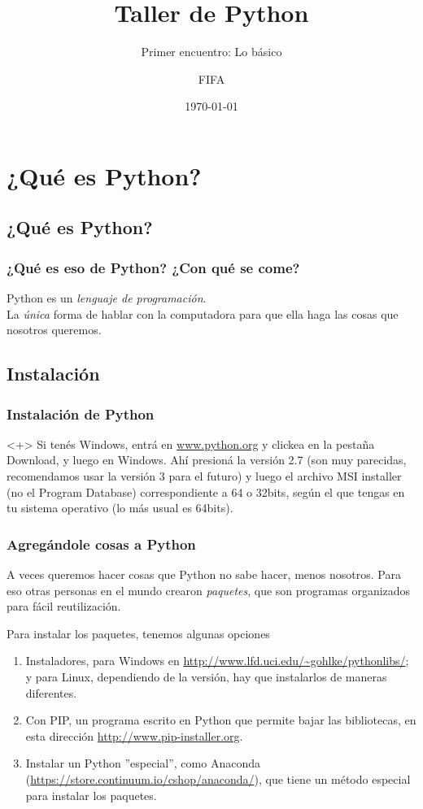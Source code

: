 \documentclass{beamer}
\title{Taller de Python}
\subtitle{Primer encuentro: Lo básico}
\author{FIFA}
\institute[FIFA]{Federación Interestudiantil de Física Argentina}
\date{\today}
\begin{document}
\begin{frame}
  \titlepage
\end{frame}


\section{¿Qué es Python?}

\subsection{¿Qué es Python?}
\begin{frame}
    \frametitle{¿Qué es eso de Python? ¿Con qué se come?}
    Python es un \emph{lenguaje de programación}.\\ La \emph{única} forma de hablar con la computadora para que ella haga las cosas que nosotros queremos.
\end{frame}

\subsection{Instalación}
\begin{frame}
    \frametitle{Instalación de Python}
    \begin{onlyenv}<+>
    Si tenés Windows, entrá en \url{www.python.org} y clickea en la pestaña Download, y luego en Windows. Ahí presioná la versión 2.7 (son muy parecidas, recomendamos usar la versión 3 para el futuro) y luego el archivo MSI installer (no el Program Database) correspondiente a 64 o 32bits, según el que tengas en tu sistema operativo (lo más usual es 64bits).
    \end{onlyenv}
\end{frame}



\begin{frame}
    \frametitle{Agregándole cosas a Python}
    A veces queremos hacer cosas que Python no sabe hacer, menos nosotros. Para eso otras personas en el mundo crearon \emph{paquetes}, que son programas organizados para fácil reutilización.
    
    Para instalar los paquetes, tenemos algunas opciones
    \begin{enumerate}
    \item{Instaladores, para Windows en \url{http://www.lfd.uci.edu/~gohlke/pythonlibs/}; y para Linux, dependiendo de la versión, hay que instalarlos de maneras diferentes.}
    \item{Con PIP, un programa escrito en Python que permite bajar las bibliotecas, en esta dirección \url{http://www.pip-installer.org}.}
    \item{Instalar un Python ''especial'', como Anaconda (\url{https://store.continuum.io/cshop/anaconda/}), que tiene un método especial para instalar los paquetes.}
    \end{enumerate}

\end{frame}
\end{document}
